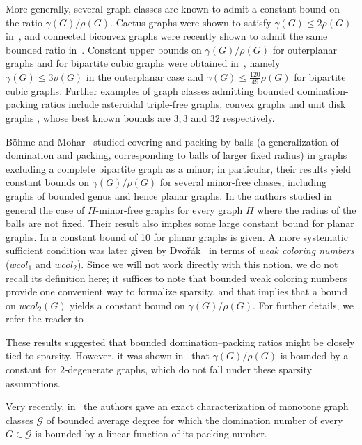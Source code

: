 \documentclass[a4paper, 12pt]{article}
\begin{document}
More generally, several graph classes are known to admit a constant bound on the ratio $\gamma(G)/\rho(G)$. Cactus graphs were shown to satisfy $\gamma(G)\le 2\rho(G)$ in~\cite{LiuRautenbachRies13}, and connected biconvex graphs were recently shown to admit the same bounded ratio in~\cite{GG25}.
Constant upper bounds on $\gamma(G)/\rho(G)$ for outerplanar graphs and for bipartite cubic graphs were obtained in~\cite{GG25}, namely $\gamma(G)\le 3\rho(G)$ in the outerplanar case and $\gamma(G)\le \tfrac{120}{49}\rho(G)$ for bipartite cubic graphs.
Further examples of graph classes admitting bounded domination-packing ratios include asteroidal triple-free graphs, convex graphs and unit disk graphs \cite{bonamy2025graph}, whose best known bounds are $3, 3$ and $32$ respectively.

B\"ohme and Mohar~\cite{BohmeMohar03} studied covering and packing by balls (a generalization of domination and packing, corresponding to balls of larger fixed radius) in graphs excluding a complete bipartite graph as a minor; in particular, their results yield constant bounds on $\gamma(G)/\rho(G)$ for several minor-free classes, including graphs of bounded genus and hence planar graphs. 
In \cite{bousquet2021packing} the authors studied in general the case of $H$-minor-free graphs for every graph $H$ where the radius of the balls are not fixed. Their result also implies some large constant bound for planar graphs. In \cite{bonamy2025graph} a constant bound of 10 for planar graphs is given.
A more systematic sufficient condition was later given by Dvo\v{r}\'ak~\cite{Dvorak13} in terms of \emph{weak coloring numbers} ($wcol_1$ and $wcol_2$). Since we will not work directly with this notion, we do not recall its definition here; it suffices to note that bounded weak coloring numbers provide one convenient way to formalize sparsity, and that \cite{Dvorak13} implies that a bound on $wcol_2(G)$ yields a constant bound on $\gamma(G)/\rho(G)$. For further details, we refer the reader to \cite{Dvorak13, hodor2025weak}.

These results suggested that bounded domination--packing ratios might be closely tied to sparsity. However, it was shown in~\cite{bonamy2025graph} that $\gamma(G)/\rho(G)$ is bounded by a constant for $2$-degenerate graphs, which do not fall under these sparsity assumptions.

Very recently, in~\cite{BonamyDvorakMichelMiksanik26} the authors gave an exact characterization of monotone graph classes $\mathcal{G}$ of bounded average degree for which the domination number of every $G\in\mathcal{G}$ is bounded by a linear function of its packing number.
\end{document}
